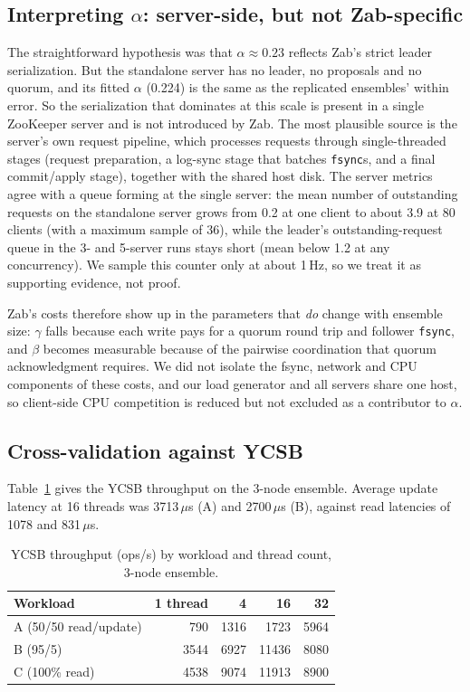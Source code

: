 \documentclass{llncs}
\begin{document}
\subsection{Interpreting $\alpha$: server-side, but not Zab-specific}

The straightforward hypothesis was that $\alpha\approx0.23$ reflects Zab's
strict leader serialization. But the standalone server has no leader, no
proposals and no quorum, and its fitted $\alpha$ (0.224) is the same as the
replicated ensembles' within error. So the serialization that dominates
at this scale is present in a single ZooKeeper server and is not introduced
by Zab. The most plausible source is the server's own request
pipeline, which processes requests through single-threaded stages
(request preparation, a log-sync stage that batches \texttt{fsync}s, and a
final commit/apply stage), together with the shared host disk. The server
metrics agree with a queue forming at the single server: the mean number of
outstanding requests on the standalone server grows from 0.2 at one client
to about 3.9 at 80 clients (with a maximum sample of 36), while the
leader's outstanding-request queue in the 3- and 5-server runs stays short
(mean below 1.2 at any concurrency). We sample this counter only at about
1\,Hz, so we treat it as supporting evidence, not proof.

Zab's costs therefore show up in the parameters that \emph{do} change with
ensemble size: $\gamma$ falls because each write pays for a quorum round
trip and follower \texttt{fsync}, and $\beta$ becomes measurable because
of the pairwise coordination that quorum acknowledgment requires. We did not
isolate the fsync, network and CPU components of these costs, and our
load generator and all servers share one host, so client-side CPU competition
is reduced but not excluded as a contributor to $\alpha$.

\subsection{Cross-validation against YCSB}

Table~\ref{tab:ycsb} gives the YCSB throughput on the 3-node ensemble.
Average update latency at 16 threads was 3713\,$\mu$s (A) and 2700\,$\mu$s
(B), against read latencies of 1078 and 831\,$\mu$s.

\begin{table}[h]
  \centering
  \caption{YCSB throughput (ops/s) by workload and thread count, 3-node
    ensemble.}
  \label{tab:ycsb}
  \begin{tabular}{@{}lrrrr@{}}
    \toprule
    Workload & 1 thread & 4 & 16 & 32 \\
    \midrule
    A (50/50 read/update) & 790  & 1316 & 1723  & 5964 \\
    B (95/5)              & 3544 & 6927 & 11436 & 8080 \\
    C (100\% read)        & 4538 & 9074 & 11913 & 8900 \\
    \bottomrule
  \end{tabular}
\end{table}
\end{document}
